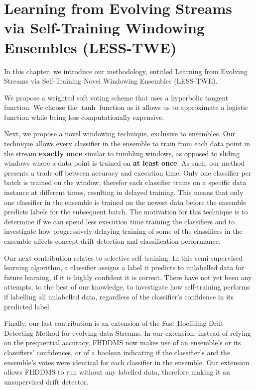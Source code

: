 \chapter{Learning from Evolving Streams via Self-Training Windowing Ensembles (LESS-TWE)\label{chapter:contributions}}%

In this chapter, we introduce our methodology, entitled Learning from Evolving Streams via Self-Training Novel Windowing Ensembles (LESS-TWE).

We propose a weighted soft voting scheme that uses a hyperbolic tangent function. We choose the $\tanh$ function as it allows us to approximate a logistic function while being less computationally expensive.

Next, we propose a novel windowing technique, exclusive to ensembles. Our technique allows every classifier in the ensemble to train from each data point in the stream \textbf{exactly once} similar to tumbling windows, as opposed to sliding windows where a data point is trained on \textbf{at least once}. As such, our method presents a trade-off between accuracy and execution time. Only one classifier per batch is trained on the window, therefor each classifier trains on a specific data instance at different times, resulting in delayed training. This means that only one classifier in the ensemble is trained on the newest data before the ensemble predicts labels for the subsequent batch.
The motivation for this technique is to determine if we can spend less execution time training the classifiers and to investigate how progressively delaying training of some of the classifiers in the ensemble affects concept drift detection and classification performance.

Our next contribution relates to selective self-training. In this semi-supervised learning algorithm, a classifier assigns a label it predicts to unlabelled data for future learning, if it is highly confident it is correct. There have not yet been any attempts, to the best of our knowledge, to investigate how self-training performs if labelling all unlabelled data, regardless of the classifier's confidence in its predicted label.

Finally, our last contribution is an extension of the Fast Hoeffding Drift Detecting Method for evolving data Streams. In our extension, instead of relying on the prequential accuracy, FHDDMS now makes use of an ensemble's or its classifiers' confidences, or of a boolean indicating if the classifier's and the ensemble's votes were identical for each classifier in the ensemble. Our extension allows FHDDMS to run without any labelled data, therefore making it an unsupervised drift detector.

